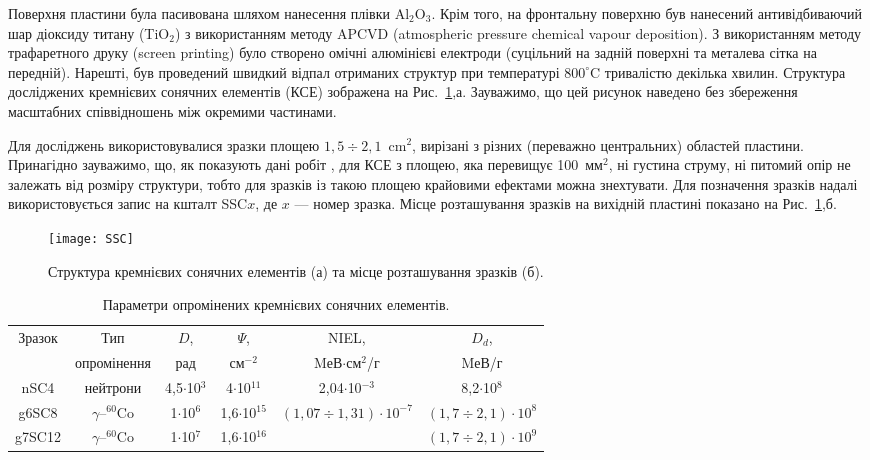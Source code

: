 Поверхня пластини була пасивована шляхом нанесення плівки Al$_2$O$_3$.
Крім того, на фронтальну поверхню був нанесений антивідбиваючий шар діоксиду титану (TiO$_2$) з використанням методу APCVD (atmospheric pressure chemical  vapour  deposition).
З використанням методу трафаретного друку (screen printing) було створено омічні алюмінієві електроди (суцільний на задній поверхні та металева сітка на передній).
Нарешті, був проведений швидкий відпал отриманих структур при температурі $800^\circ$C тривалістю декілька хвилин.
Структура досліджених кремнієвих сонячних елементів (КСЕ) зображена на Рис.~\ref{figSSC},а.
Зауважимо, що цей рисунок наведено без збереження масштабних співвідношень між окремими частинами.

Для досліджень використовувалися зразки площею $1,5\div2,1$~cm$^{2}$, вирізані з різних (переважно центральних) областей пластини.
Принагідно зауважимо, що, як показують дані робіт \cite{Breitenstein2013,SC:Area}, для КСЕ з площею, яка
перевищує 100~мм$^2$, ні густина струму, ні питомий опір не залежать від розміру структури,
тобто для зразків із такою площею крайовими ефектами можна знехтувати.
Для позначення зразків надалі використовується запис на кшталт SSC$x$, де $x$ --- номер зразка.
Місце розташування зразків на вихідній пластині показано на Рис.~\ref{figSSC},б.

\begin{figure}
\center
\texttt{[image: SSC]}%
\caption{\label{figSSC}
Структура кремнієвих сонячних елементів (а) та місце розташування зразків (б).
}
\end{figure}


\begin{table}[b]
\caption{\label{tabSSCSample}Параметри опромінених кремнієвих сонячних елементів.
}
\begin{tabular}{|c|c|c|c|c|c|}
\hline
\multirow{2}{*}{Зразок} &Тип&$D$,&$\Psi$, &NIEL,& $D_d$,  \\
&опромінення& рад& см$^{-2}$&MеВ$\cdot$см$^2$/г& MеВ/г \\
\hline
nSC4&нейтрони&4,5$\cdot$10$^3$&4$\cdot$10$^{11}$&2,04$\cdot$10$^{-3}$&8,2$\cdot$10$^{8}$\\ \hline
g6SC8&$\gamma$--$^{60}$Co&1$\cdot$10$^6$&1,6$\cdot$10$^{15}$&$(1,07\div1,31)\cdot10^{-7}$&$(1,7\div2,1)\cdot 10^{8}$\\
\cline{1-4}
\cline{6-6}
g7SC12&$\gamma$--$^{60}$Co&1$\cdot$10$^7$&1,6$\cdot$10$^{16}$&\cite{NIEL:Akkerman,NIEL:Messenger,NIEL:Allam}&$(1,7\div2,1)\cdot 10^9$\\ \hline
\end{tabular}
\end{table}

